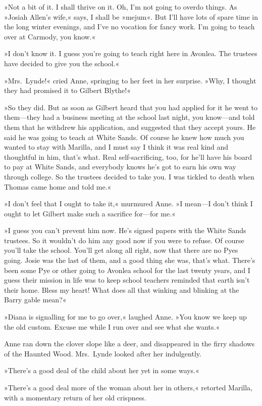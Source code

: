 »Not a bit of it. I shall thrive on it. Oh, I'm not going to overdo things. As »Josiah Allen's wife,« says, I shall be »mejum«. But I'll have lots of spare time in the long winter evenings, and I've no vocation for fancy work. I'm going to teach over at Carmody, you know.«

»I don't know it. I guess you're going to teach right here in Avonlea. The trustees have decided to give you the school.«

»Mrs.~Lynde!« cried Anne, springing to her feet in her surprise. »Why, I thought they had promised it to Gilbert Blythe!«

»So they did. But as soon as Gilbert heard that you had applied for it he went to them—they had a business meeting at the school last night, you know—and told them that he withdrew his application, and suggested that they accept yours. He said he was going to teach at White Sands. Of course he knew how much you wanted to stay with Marilla, and I must say I think it was real kind and thoughtful in him, that's what. Real self-sacrificing, too, for he'll have his board to pay at White Sands, and everybody knows he's got to earn his own way through college. So the trustees decided to take you. I was tickled to death when Thomas came home and told me.«

»I don't feel that I ought to take it,« murmured Anne. »I mean—I don't think I ought to let Gilbert make such a sacrifice for—for me.«

»I guess you can't prevent him now. He's signed papers with the White Sands trustees. So it wouldn't do him any good now if you were to refuse. Of course you'll take the school. You'll get along all right, now that there are no Pyes going. Josie was the last of them, and a good thing she was, that's what. There's been some Pye or other going to Avonlea school for the last twenty years, and I guess their mission in life was to keep school teachers reminded that earth isn't their home. Bless my heart! What does all that winking and blinking at the Barry gable mean?«

»Diana is signalling for me to go over,« laughed Anne. »You know we keep up the old custom. Excuse me while I run over and see what she wants.«

Anne ran down the clover slope like a deer, and disappeared in the firry shadows of the Haunted Wood. Mrs.~Lynde looked after her indulgently.

»There's a good deal of the child about her yet in some ways.«

»There's a good deal more of the woman about her in others,« retorted Marilla, with a momentary return of her old crispness.

